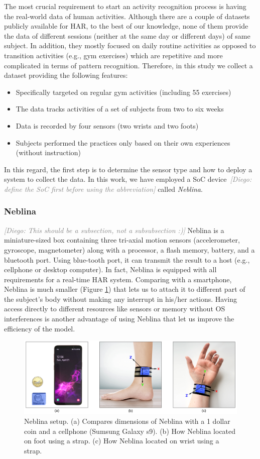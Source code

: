 \documentclass[journal,article,submit,moreauthors,pdftex]{Definitions/mdpi}
\newcommand{\diego}[1]{\textcolor{gray}{{\it [Diego: #1]}}}
\begin{document}
The most crucial requirement to start an activity recognition process is having the real-world data of human activities. Although there are a couple of datasets publicly available for HAR\cite{wang2019survey}, to the best of our knowledge, none of them provide the data of different sessions (neither at the same day or different days) of same subject. In addition, they mostly focused on daily routine activities as opposed to transition activities (e.g., gym exercises) which are repetitive and more complicated in terms of pattern recognition\cite{wang2019survey}. Therefore, in this study we collect a dataset providing the following features:
\begin{itemize}[leftmargin=*,labelsep=5.8mm]
	\item Specifically targeted on regular gym activities (including 55 exercises)
	\item The data tracks activities of a set of subjects from two to six weeks
	\item Data is recorded by four sensors (two wrists and two foots)
	\item Subjects performed the practices only based on their own experiences (without instruction) 
\end{itemize}
In this regard, the first step is to determine the sensor type and how to deploy a system to collect the data. In this work, we have employed a SoC device~\diego{define the SoC first before using the abbreviation} called \textit{Neblina}.
\subsubsection{Neblina}
\diego{This should be a subsection, not a subsubsection :)}
Neblina is a miniature-sized box containing three tri-axial motion sensors (accelerometer, gyroscope, magnetometer) along with a processor, a flash memory, battery, and a bluetooth port. Using blue-tooth port, it can transmit the result to a host (e.g., cellphone or desktop computer).  In fact, Neblina is equipped with all requirements for a real-time HAR system. Comparing with a smartphone, Neblina is much smaller (Figure \ref{neblina_setup}) that lets us to attach it to different part of the subject's body without making any interrupt in his/her actions\cite{de2018comparative}. Having access directly to different resources like sensors or memory without OS interferences is another advantage of using Neblina that let us improve the efficiency of the model.
\begin{figure}[H]
	\centering
	\includegraphics[width=10 cm]{Definitions/images/neblina_setup.jpg}
	\caption{Neblina setup. (a) Compares dimensions of Neblina with a 1 dollar coin and a cellphone (Sumsung Galaxy s9). (b) How Neblina located on foot using a strap. (c) How Neblina located on wrist using a strap.}
	\label{neblina_setup}
\end{figure} 
\end{document}
